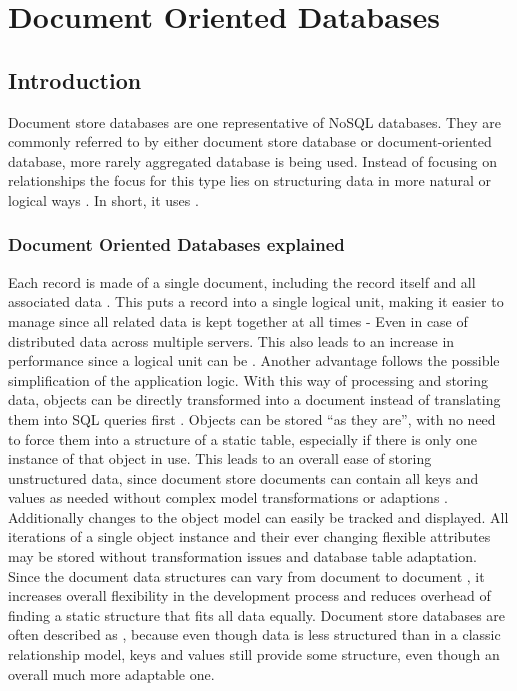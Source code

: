 \chapter{Document Oriented Databases}
\section{Introduction}
Document store databases are one representative of NoSQL databases. They are commonly referred to by either document store database or document-oriented database, more rarely aggregated database is being used. Instead of focusing on relationships the focus for this type lies on structuring data in more natural or logical ways \parencite{mongodb2019}. In short, it uses . 

\subsection{Document Oriented Databases explained}
Each record is made of a single document, including the record itself and all associated data \parencite{ian2016}\parencite{amazonNoSql}. This puts a record into a single logical unit, making it easier to manage since all related data is kept together at all times - Even in case of distributed data across multiple servers. This also leads to an increase in performance since a logical unit can be . Another advantage follows the possible simplification of the application logic. With this way of processing and storing data, objects can be directly transformed into a document instead of translating them into SQL queries first \parencite{mongodb2019}  \parencite{amazonNoSql}. Objects can be stored \enquote{as they are}, with no need to force them into a structure of a static table, especially if there is only one instance of that object in use. This leads to an overall ease of storing unstructured data, since document store documents can contain all keys and values as needed without complex model transformations or adaptions \parencite{mongodb2019}. Additionally changes to the object model can easily be tracked and displayed. All iterations of a single object instance and their ever changing flexible attributes may be stored without transformation issues and database table adaptation. Since the document data structures can vary from document to document  \parencite{amazonNoSql}, it increases overall flexibility in the development process and reduces overhead of finding a static structure that fits all data equally. Document store databases are often described as , because even though data is less structured than in a classic relationship model, keys and values still provide some structure, even though an overall much more adaptable one.

